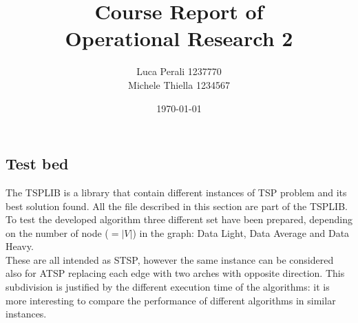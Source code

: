 \documentclass[10pt, english, openany]{report}
\title{Course Report of \\ Operational Research 2}
\author{Luca Perali 1237770 \\ Michele Thiella 1234567}
\date{\today}
\begin{document}

	
	

	\tableofcontents{}
	\clearpage

	
	
	
	
	
	
	
	
	
	\clearpage
	
	\begin{appendices}
		\chapter{Test bed} \label{sec:testset}
		The TSPLIB \cite{TSPLIB} is a library that contain different instances of TSP problem and its best solution found. All the file described in this section are part of the TSPLIB. To test the developed algorithm three different set have been prepared, depending on the number of node ($=|V|$) in the graph: Data Light, Data Average and Data Heavy.\\
		These are all intended as STSP, however the same instance can be considered also for ATSP replacing each edge with two arches with opposite direction. This subdivision is justified by the different execution time of the algorithms: it is more interesting to compare the performance of different algorithms in similar instances.\\
		

\end{appendices}
\end{document}
